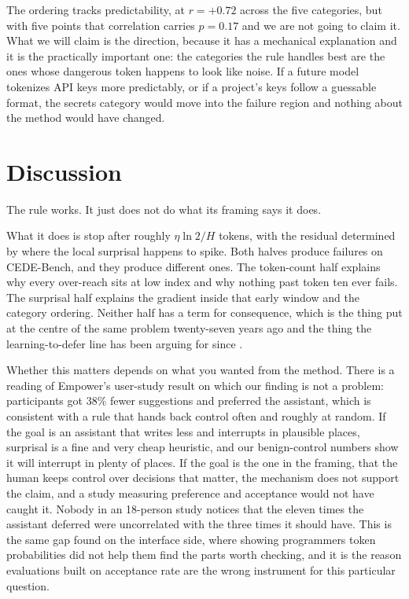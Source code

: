 \documentclass[10pt]{article}
\begin{document}
The ordering tracks predictability, at $r = +0.72$ across the five categories, but with five points
that correlation carries $p = 0.17$ and we are not going to claim it. What we will claim is the
direction, because it has a mechanical explanation and it is the practically important one: the
categories the rule handles best are the ones whose dangerous token happens to look like noise. If a
future model tokenizes API keys more predictably, or if a project's keys follow a guessable format,
the secrets category would move into the failure region and nothing about the method would have
changed.

\section{Discussion}

The rule works. It just does not do what its framing says it does.

What it does is stop after roughly $\eta \ln 2 / H$ tokens, with the residual determined by where
the local surprisal happens to spike. Both halves produce failures on CEDE-Bench, and they produce
different ones. The token-count half explains why every over-reach sits at low index and why nothing
past token ten ever fails. The surprisal half explains the gradient inside that early window and the
category ordering. Neither half has a term for consequence, which is the thing
\citet{horvitz1999} put at the centre of the same problem twenty-seven years ago and the thing the
learning-to-defer line has been arguing for since \citet{chow1970}.

Whether this matters depends on what you wanted from the method. There is a reading of Empower's
user-study result on which our finding is not a problem: participants got 38\% fewer suggestions and
preferred the assistant, which is consistent with a rule that hands back control often and roughly
at random. If the goal is an assistant that writes less and interrupts in plausible places, surprisal
is a fine and very cheap heuristic, and our benign-control numbers show it will interrupt in plenty
of places. If the goal is the one in the framing, that the human keeps control over decisions that
matter, the mechanism does not support the claim, and a study measuring preference and acceptance
would not have caught it. Nobody in an 18-person study notices that the eleven times the assistant
deferred were uncorrelated with the three times it should have. This is the same gap
\citet{vasconcelos2023} found on the interface side, where showing programmers token probabilities
did not help them find the parts worth checking, and it is the reason evaluations built on
acceptance rate \citep{mozannar2024} are the wrong instrument for this particular question.
\end{document}
